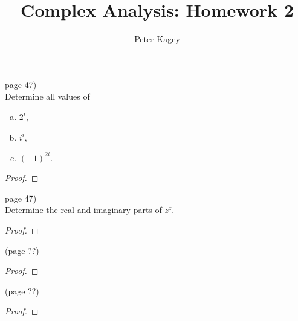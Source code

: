 \documentclass{article}
\newenvironment{problem}[2][Problem]{\begin{trivlist}
\item[\hskip \labelsep {\bfseries #1}\hskip \labelsep {\bfseries #2.}]}{\end{trivlist}}
\begin{document}
\title{Complex Analysis: Homework 2}
\author{Peter Kagey}

\maketitle

\pagebreak

\begin{problem}{6} (page 47) \\
  Determine all values of \begin{enumerate}[(a)]
    \item $2^i$,
    \item $i^i$,
    \item $(-1)^{2i}$.
  \end{enumerate}
\end{problem}

\begin{proof}
\end{proof}
\pagebreak

\begin{problem}{7} (page 47) \\
  Determine the real and imaginary parts of $z^z$.
\end{problem}

\begin{proof}
\end{proof}
\pagebreak

\begin{problem}{?} (page ??) \\
\end{problem}

\begin{proof}
\end{proof}


\pagebreak

\begin{problem}{?} (page ??) \\
\end{problem}

\begin{proof}
\end{proof}
\end{document}
